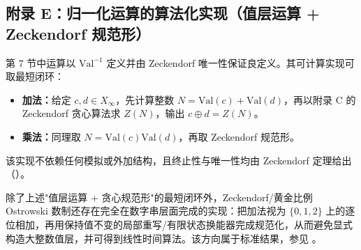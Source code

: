 \subsection{附录 E：归一化运算的算法化实现（值层运算 + Zeckendorf 规范形）}

第 7 节中运算以 $\mathrm{Val}^{-1}$ 定义并由 Zeckendorf 唯一性保证良定义。其可计算实现可取最短闭环：
\begin{itemize}
  \item \textbf{加法：}给定 $c,d\in X_\infty$，先计算整数 $N=\mathrm{Val}(c)+\mathrm{Val}(d)$，再以附录 C 的 Zeckendorf 贪心算法求 $Z(N)$，输出 $c\oplus d=Z(N)$。
  \item \textbf{乘法：}同理取 $N=\mathrm{Val}(c)\mathrm{Val}(d)$，再取 Zeckendorf 规范形。
\end{itemize}
该实现不依赖任何模拟或外加结构，且终止性与唯一性均由 Zeckendorf 定理给出（\cite{Zeckendorf1972}）。

\begin{remark}\label{rem:zeckendorf-normalize-fst}
除了上述"值层运算 + 贪心规范形"的最短闭环外，Zeckendorf/黄金比例 Ostrowski 数制还存在完全在数字串层面完成的实现：把加法视为 \(\{0,1,2\}\) 上的逐位相加，再用保持值不变的局部重写/有限状态换能器完成规范化，从而避免显式构造大整数值层，并可得到线性时间算法。该方向属于标准结果，参见 \cite{Frougny1992NumbersAutomata,Frougny1999OnlineAddition,AhlbachUsatineFrougnyPippenger2013,HieronymiTerry2018OstrowskiAddition}。
\end{remark}
